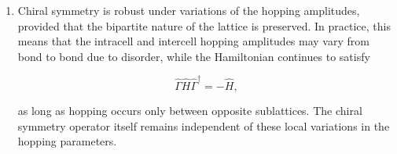 \documentclass[11pt, a4paper]{article}
\begin{document}
\begin{enumerate}
\[
\{\sigma_i,\sigma_j\}=2\delta_{ij}I,
\]

one finds

\[
\sigma_z\sigma_x\sigma_z=-\sigma_x,\qquad
\sigma_z\sigma_y\sigma_z=-\sigma_y.
\]

then we obtain

\begin{align}
\sigma_z H(k)\sigma_z
&=-d_x(k)\sigma_x-d_y(k)\sigma_y \\
&=-H(k).
\end{align}

Hence,

\begin{equation}
\sigma_z H(k)\sigma_z^\dagger=-H(k),
\end{equation}

which is precisely the defining condition for chiral symmetry. Equivalently,

\begin{equation}
\{\sigma_z,H(k)\}=0.
\end{equation}

The above result is possible because the SSH Hamiltonian contains only the
$\sigma_x$ and $\sigma_y$ Pauli matrices,

\[
H(k)=d_x(k)\sigma_x+d_y(k)\sigma_y,
\]

with no $\sigma_z$ component, i.e.,

\[
d_z(k)=0.
\]

Consequently, the vector
\[
\mathbf d(k)=\left(d_x(k),\,d_y(k),\,0\right)
\]
is constrained to lie entirely in the $d_x$--$d_y$ plane. This geometric
constraint is essential for defining the winding number, which classifies the
topological phases of the SSH model. Physically, the absence of a $\sigma_z$
term reflects the bipartite nature of the lattice: hopping occurs only between different sublattices, while no terms couple sites within the same sublattice or produce an on-site energy difference between them.

\item
Chiral symmetry is robust under variations of the hopping amplitudes, provided that
the bipartite nature of the lattice is preserved. In practice, this means that the
intracell and intercell hopping amplitudes may vary from bond to bond due to
disorder, while the Hamiltonian continues to satisfy

\[
\hat{\Gamma}\hat{H}\hat{\Gamma}^{\dagger}
=
-\hat{H},
\]

as long as hopping occurs only between opposite sublattices. The chiral symmetry
operator itself remains independent of these local variations in the hopping
parameters.

\end{enumerate}
\end{document}
